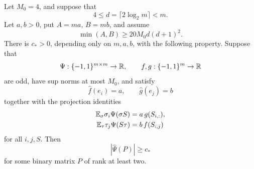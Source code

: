 \begin{lemma}\label{lem:coefficient}
Let \(M_0=4\), and suppose that
\[
4\le d=\lceil2\log_2m\rceil<m.
\]
Let \(a,b>0\), put \(A=ma\), \(B=mb\), and assume
\begin{equation}\label{eq:large-parameters}
\min(A,B)\ge20M_0d(d+1)^2.
\end{equation}
There is \(c_*>0\), depending only on \(m,a,b\), with the following
property. Suppose that
\[
\Psi:\{-1,1\}^{m\times m}\to\mathbb R,\qquad
f,g:\{-1,1\}^m\to\mathbb R
\]
are odd, have sup norms at most \(M_0\), and satisfy
\begin{equation}\label{eq:scalar-first}
\widehat f(e_i)=a,\qquad \widehat g(e_j)=b
\end{equation}
together with the projection identities
\begin{equation}\label{eq:scalar-projections}
\begin{split}
\mathbb E_\sigma\sigma_i\Psi(\sigma S)&=a\,g(S_{i,:}),\\
\mathbb E_\tau\tau_j\Psi(S\tau)&=b\,f(S_{:,j})
\end{split}
\end{equation}
for all \(i,j,S\). Then
\[
|\widehat\Psi(P)|\ge c_*
\]
for some binary matrix \(P\) of rank at least two.
\end{lemma}

